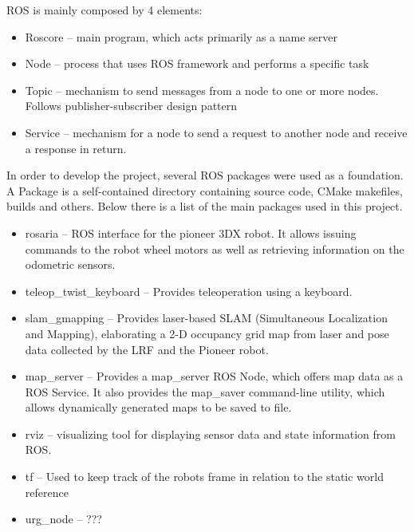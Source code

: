 ROS is mainly composed by 4 elements:
\begin{itemize}
\item Roscore -- main program, which acts primarily as a name server
\item Node -- process that uses ROS framework and performs a specific task
\item Topic -- mechanism to send messages from a node to one or more nodes. Follows publisher-subscriber design pattern
\item Service -- mechanism for a node to send a request to another node and receive a response in return.
\end{itemize}
In order to develop the project, several ROS packages were used as a foundation. A Package is a self-contained directory containing source code, CMake makefiles, builds and others. Below there is a list of the main packages used in this project.
\begin{itemize}
\item rosaria -- ROS interface for the pioneer 3DX robot. It allows issuing commands to the robot wheel motors as well as retrieving information on the odometric sensors.
\item teleop\_twist\_keyboard -- Provides teleoperation using a keyboard. %
\item slam\_gmapping -- Provides laser-based SLAM (Simultaneous Localization and Mapping), elaborating a 2-D occupancy grid map from laser and pose data collected by the LRF and the Pioneer robot.
\item map\_server -- Provides a map\_server ROS Node, which offers map data as a ROS Service. It also provides the map\_saver command-line utility, which allows dynamically generated maps to be saved to file.
\item rviz -- visualizing tool for displaying sensor data and state information from ROS.
\item tf -- Used to keep track of the robots frame in relation to the static world reference
\item urg\_node -- ???
\end{itemize}


